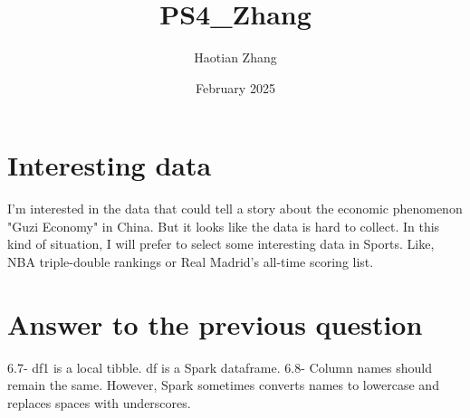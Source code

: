 \documentclass{article}
\title{PS4_Zhang}
\author{Haotian Zhang}
\date{February 2025}
\begin{document}
 
\maketitle 
\section{Interesting data} 
I'm interested in the data that could tell a story about the economic phenomenon "Guzi 
Economy" in China. But it looks like the data is hard to collect. In this kind of situation, I will prefer to select some interesting data in 
Sports. Like, NBA triple-double rankings or Real Madrid's all-time scoring list. 

\section{Answer to the previous question} 
6.7- df1 is a local tibble. df is a Spark dataframe. 
6.8- Column names should remain the same. However, Spark sometimes converts names to lowercase and 
replaces spaces with underscores.
\end{document}
